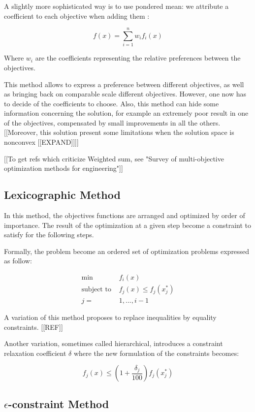 A slightly more sophisticated way is to use pondered mean: we attribute a coefficient to each objective when adding them :

\[ f(x) =\sum_{i=1}^n w_i f_i(x) \]

Where $w_i$ are the coefficients representing the relative preferences between the objectives.

This method allows to express a preference between different objectives, as well as bringing back on comparable scale different objectives. However, one now has to decide of the coefficients to choose. Also, this method can hide some information concerning the solution, for example an extremely poor result in one of the objectives, compensated by small improvements in all the others.  [[Moreover, this solution present some limitations when the solution space is nonconvex [[EXPAND]]]]

[[To get refs which criticize Weighted sum, see "Survey of multi-objective optimization methods for engineering"]]

\subsection{Lexicographic Method}

In this method, the objectives functions are arranged and optimized by order of importance. The result of the optimization at a given step become a constraint to satisfy for the following steps.

Formally, the problem become an ordered set of optimization problems expressed as follow:

\begin{align*}
\text{min } &f_i(x) \\
\text{subject to } &f_j(x) \leq f_j(x_j^*) \\
j = &1, ..., i-1
\end{align*}

A variation of this method proposes to replace inequalities by equality constraints. [[REF]]

Another variation, sometimes called hierarchical, introduces a constraint relaxation coefficient $\delta$ where the new formulation of the constraints becomes:

\[ f_j(x) \leq \left(1 + \frac{\delta_j}{100}\right) f_j(x_j^*) \]

\subsection{$\epsilon$-constraint Method}

